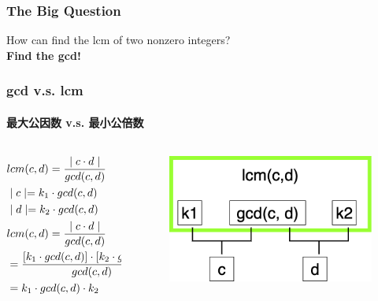 \documentclass[
	11pt, %
	handout,
]{beamer}
\begin{document}

\begin{frame}
	\frametitle{The Big Question}
	\bigskip
	{\LARGE How can find the lcm of two nonzero integers?}\\
	\bigskip
	\pause
	{\LARGE \alert{\textbf{Find the gcd!}}}
\end{frame}



\begin{frame}
	\frametitle{gcd v.s. lcm}
	\framesubtitle{最大公因数 v.s. 最小公倍数}

	
	\begin{columns}[c] %
		\begin{column}{0.6\textwidth} %

				\begin{equation*}
					\begin{split}
						&lcm(c, d) = \frac{\mid c \cdot d \mid}{gcd(c, d)} \\
						\bigskip
				    &\mid c \mid= k_1 \cdot gcd(c, d) \\
				    \bigskip
				    &\mid d \mid= k_2 \cdot gcd(c, d) \\
				    \bigskip
				    &lcm(c, d) = \frac{\mid c \cdot d \mid}{gcd(c, d)} \\
				              &= \frac{[k_1 \cdot gcd(c, d)] \cdot [k_2 \cdot gcd(c, d)] }{gcd(c, d)} \\
				              &= k_1 \cdot gcd(c, d) \cdot k_2
					\end{split}
				\end{equation*}

		\end{column}
		\begin{column}{0.4\textwidth} %
			\begin{figure}
				\includegraphics[width=\textwidth]{LCM.png}
			\end{figure}
		
		\end{column}
	\end{columns}
\end{frame}
\end{document}

